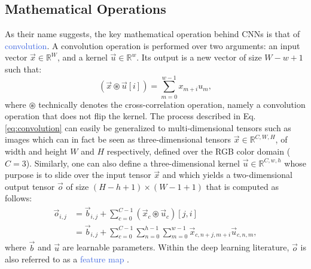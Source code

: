 \subsection{Mathematical Operations}
\label{sec:operations}

As their name suggests, the key mathematical operation behind CNNs is that of \textcolor{RoyalBlue}{convolution}. A convolution operation is performed over two arguments: an input vector $\vec{x}\in\mathds{R}^{W}$, and a kernel $\vec{u}\in\mathds{R}^{w}$. Its output is a new vector of size $W-w+1$ such that:
\begin{equation}
	(\vec{x}\circledast\vec{u}[i]) = \sum_{m=0}^{w-1}x_{m+i}u_m,
	\label{eq:convolution}
\end{equation}
where $\circledast$ technically denotes the cross-correlation operation, namely a convolution operation that does not flip the kernel. The process described in Eq. \ref{eq:convolution} can easily be generalized to multi-dimensional tensors such as images which can in fact be seen as three-dimensional tensors $\vec{x}\in\mathds{R}^{C,W,H}$, of width and height $W$ and $H$ respectively, defined over the RGB color domain ($C=3$). Similarly, one can also define a three-dimensional kernel $\vec{u}\in\mathds{R}^{C,w,h}$ whose purpose is to slide over the input tensor $\vec{x}$ and which yields a two-dimensional output tensor $\vec{o}$ of size $(H-h+1)\times(W-1+1)$ that is computed as follows:
\begin{equation}
	\begin{split}
		\vec{o}_{i,j} & = \vec{b}_{i,j} + \sum_{c=0}^{C-1}(\vec{x}_c\circledast\vec{u}_c)[j,i] \\ 
			      & = \vec{b}_{i,j} + \sum_{c=0}^{C-1} \sum_{n=0}^{h-1}\sum_{m=0}^{w-1} \vec{x}_{c,n+j,m+i}\vec{u}_{c,n,m},
	\end{split}
\end{equation}
where $\vec{b}$ and $\vec{u}$ are learnable parameters. Within the deep learning literature, $\vec{o}$ is also referred to as a \textcolor{RoyalBlue}{feature map} \cite{goodfellow2016deep}.

